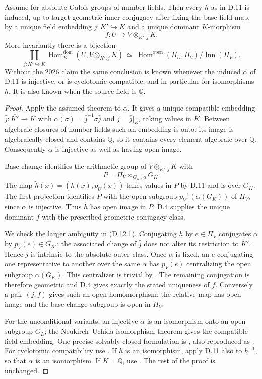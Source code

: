 Assume \citet[Theorem 1.1]{OpenAI031} for absolute Galois groups of number
fields.  Then every $h$ as in D.11 is induced, up to target geometric inner
conjugacy after fixing the base-field map, by a unique field embedding
$j:K'\hookrightarrow K$ and a unique dominant $K$-morphism
\[
 f:U\longrightarrow V\otimes_{K',j}K.
\]
More invariantly there is a bijection
\[
 \coprod_{j:K'\hookrightarrow K}
 \operatorname{Hom}^{\mathrm{dom}}_K(U,V\otimes_{K',j}K)
 \ \simeq\
 \operatorname{Hom}^{\mathrm{open}}(\Pi_U,\Pi_V)\big/\operatorname{Inn}(\Pi_V).
 \tag{D.12.1}
\]
Without the 2026 claim the same conclusion is known whenever the induced
$\alpha$ of D.11 is injective, or is cyclotomic-compatible, and in particular
for isomorphisms $h$.  It is also known when the source field is $\mathbb Q$.
\begin{proof}
Apply the assumed theorem to $\alpha$.  It gives a unique compatible embedding
$\bar j:\overline {K'}\to\overline K$ with
$\alpha(\sigma)=\bar j^{-1}\sigma\bar j$ and $j=\bar j|_{K'}$ taking values
in $K$.  Between algebraic closures of number fields such an embedding is
onto: its image is algebraically closed and contains $\mathbb Q$, so it
contains every element algebraic over $\mathbb Q$.  Consequently $\alpha$
is injective as well as having open image.

Base change identifies the arithmetic group of $V\otimes_{K',j}K$ with
\[
 P=\Pi_V\mathbin{\times}_{G_{K'},\alpha}G_K.
\]
The map $\widetilde h(x)=(h(x),p_U(x))$ takes values in $P$ by D.11 and is
over $G_K$.  The first projection identifies $P$ with the open subgroup
$p_V^{-1}(\alpha(G_K))$ of $\Pi_V$, since $\alpha$ is injective.
Thus $\widetilde h$ has open image in $P$.  D.4 supplies the unique dominant
$f$ with the prescribed geometric conjugacy class.

We check the larger ambiguity in (D.12.1).  Conjugating $h$ by $e\in\Pi_V$
conjugates $\alpha$ by $p_V(e)\in G_{K'}$; the associated change of $\bar j$
does not alter its restriction to $K'$.  Hence $j$ is intrinsic to the absolute
outer class.  Once $\alpha$ is fixed, an $e$ conjugating one representative
to another over the same $\alpha$ has $p_V(e)$ centralizing the open subgroup
$\alpha(G_K)$.  This centralizer is trivial by
\citet[Corollary 2.2]{Mochizuki2006}.  The remaining conjugation is therefore
geometric and D.4 gives exactly the stated uniqueness of $f$.  Conversely a
pair $(j,f)$ gives such an open homomorphism: the relative map has open image
and the base-change subgroup is open in $\Pi_V$.

For the unconditional variants, an injective $\alpha$ is an isomorphism onto
an open subgroup $G_L$; the Neukirch--Uchida isomorphism theorem gives the
compatible field embedding.  One precise solvably-closed formulation is
\citet[Theorem, p.~359]{Uchida1979}, also reproduced as
\citet[Theorem 3.1]{Mochizuki2006}.  For cyclotomic compatibility use
\citet[Theorem 3.4]{Hoshi2025}.  If $h$ is an isomorphism, apply D.11 also
to $h^{-1}$, so that $\alpha$ is an isomorphism.  If $K=\mathbb Q$, use
\citet[Theorem 1]{Uchida1981}.  The rest of the proof is unchanged.
\end{proof}
